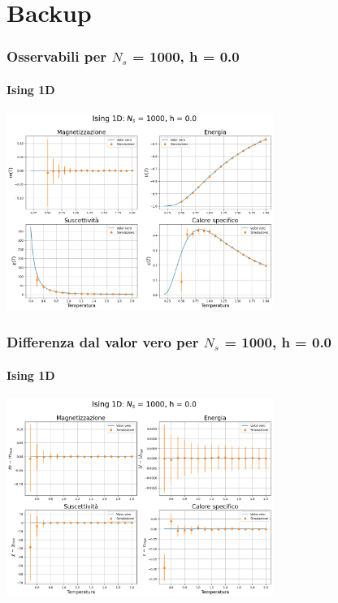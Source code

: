 \section{Backup}

\begin{frame}
    \frametitle{Osservabili per $N_s$ = 1000, h = 0.0}
    \framesubtitle{Ising 1D}

    \centering
    \includegraphics[width=0.65\textwidth]{Immagini/backupIsing1D/obs_1000_0.0.png}

\end{frame}



\begin{frame}
    \frametitle{Differenza dal valor vero per $N_s$ = 1000, h = 0.0}
    \framesubtitle{Ising 1D}

    \centering
    \includegraphics[width=0.65\textwidth]{Immagini/backupIsing1D/obs_1000_0.0_diff.png}

\end{frame}



